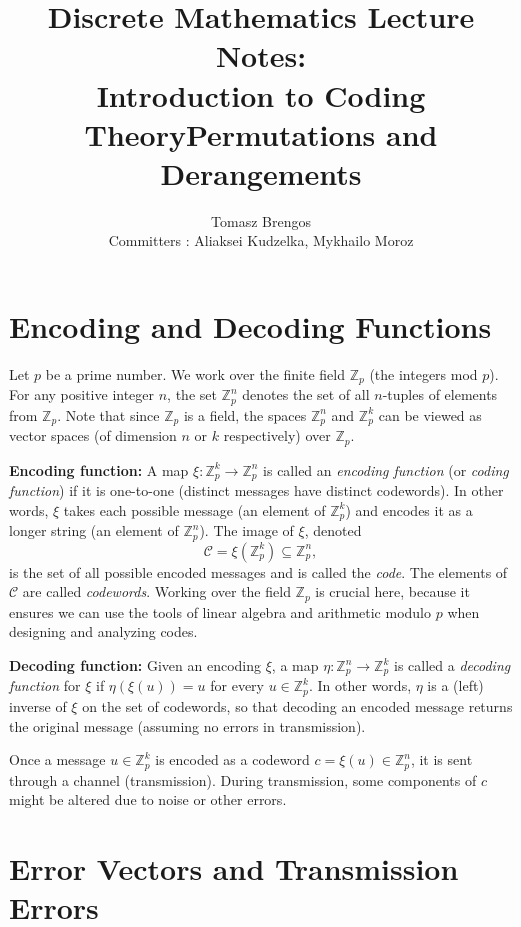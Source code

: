 \documentclass[docmute]{article}
\title{Discrete Mathematics Lecture Notes:\\Introduction to Coding Theory}
\author{}
\date{}
\title{Permutations and Derangements}
\author{Tomasz Brengos \\  
Committers : Aliaksei Kudzelka, Mykhailo Moroz}
\date{}
\begin{document}
\maketitle


\section{Encoding and Decoding Functions}

Let $p$ be a prime number. We work over the finite field $\mathbb{Z}_p$ (the integers mod $p$). For any positive integer $n$, the set $\mathbb{Z}_p^n$ denotes the set of all $n$-tuples of elements from $\mathbb{Z}_p$. Note that since $\mathbb{Z}_p$ is a field, the spaces $\mathbb{Z}_p^n$ and $\mathbb{Z}_p^k$ can be viewed as vector spaces (of dimension $n$ or $k$ respectively) over $\mathbb{Z}_p$.

\medskip

\noindent \textbf{Encoding function:} A map $\xi: \mathbb{Z}_p^k \to \mathbb{Z}_p^n$ is called an \emph{encoding function} (or \emph{coding function}) if it is one-to-one (distinct messages have distinct codewords). In other words, $\xi$ takes each possible message (an element of $\mathbb{Z}_p^k$) and encodes it as a longer string (an element of $\mathbb{Z}_p^n$). The image of $\xi$, denoted 
\[ \mathcal{C} = \xi(\mathbb{Z}_p^k) \subseteq \mathbb{Z}_p^n, \] 
is the set of all possible encoded messages and is called the \emph{code}. The elements of $\mathcal{C}$ are called \emph{codewords}. Working over the field $\mathbb{Z}_p$ is crucial here, because it ensures we can use the tools of linear algebra and arithmetic modulo $p$ when designing and analyzing codes.

\medskip

\noindent \textbf{Decoding function:} Given an encoding $\xi$, a map $\eta: \mathbb{Z}_p^n \to \mathbb{Z}_p^k$ is called a \emph{decoding function} for $\xi$ if $\eta(\xi(u)) = u$ for every $u \in \mathbb{Z}_p^k$. In other words, $\eta$ is a (left) inverse of $\xi$ on the set of codewords, so that decoding an encoded message returns the original message (assuming no errors in transmission).

\medskip

Once a message $u \in \mathbb{Z}_p^k$ is encoded as a codeword $c = \xi(u) \in \mathbb{Z}_p^n$, it is sent through a channel (transmission). During transmission, some components of $c$ might be altered due to noise or other errors.

\section{Error Vectors and Transmission Errors}
\end{document}
